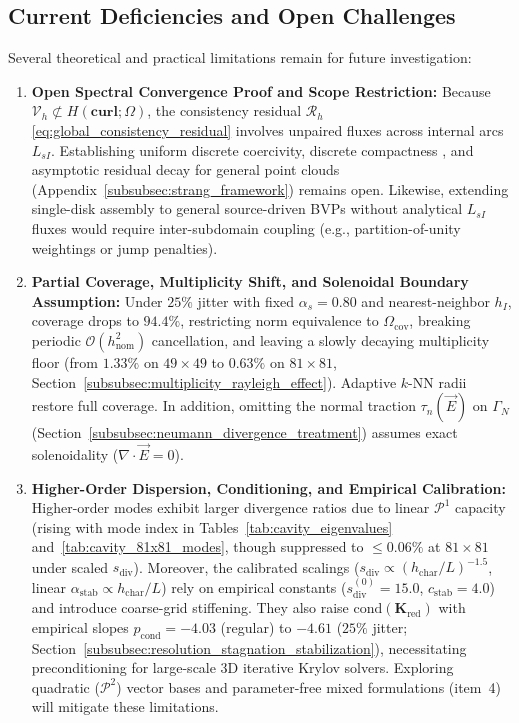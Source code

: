 \documentclass[VANCOUVER]{USG}
\begin{document}
\subsection{Current Deficiencies and Open Challenges}
\label{subsec:deficiencies_challenges}

Several theoretical and practical limitations remain for future investigation:
\begin{enumerate}
    \item \textbf{Open Spectral Convergence Proof and Scope Restriction:} Because $\mathcal{V}_h \not\subset H(\mathbf{curl};\Omega)$, the consistency residual $\mathcal{R}_h$ \eqref{eq:global_consistency_residual} involves unpaired fluxes across internal arcs $L_{sI}$. Establishing uniform discrete coercivity, discrete compactness \cite{boffi2006finite, boffi2013mixed}, and asymptotic residual decay for general point clouds (Appendix~\ref{subsubsec:strang_framework}) remains open. Likewise, extending single-disk assembly to general source-driven BVPs without analytical $L_{sI}$ fluxes would require inter-subdomain coupling (e.g., partition-of-unity weightings or jump penalties).
    \item \textbf{Partial Coverage, Multiplicity Shift, and Solenoidal Boundary Assumption:} Under $25\%$ jitter with fixed $\alpha_s = 0.80$ and nearest-neighbor $h_I$, coverage drops to $94.4\%$, restricting norm equivalence to $\Omega_{\mathrm{cov}}$, breaking periodic $\mathcal{O}(h_{\mathrm{nom}}^2)$ cancellation, and leaving a slowly decaying multiplicity floor (from $1.33\%$ on $49\times 49$ to $0.63\%$ on $81\times 81$, Section~\ref{subsubsec:multiplicity_rayleigh_effect}). Adaptive $k$-NN radii restore full coverage. In addition, omitting the normal traction $\tau_n(\vec{E})$ on $\Gamma_N$ (Section~\ref{subsubsec:neumann_divergence_treatment}) assumes exact solenoidality ($\nabla \cdot \vec{E} = 0$).
    \item \textbf{Higher-Order Dispersion, Conditioning, and Empirical Calibration:} Higher-order modes exhibit larger divergence ratios due to linear $\mathcal{P}^1$ capacity (rising with mode index in Tables~\ref{tab:cavity_eigenvalues} and~\ref{tab:cavity_81x81_modes}, though suppressed to $\le 0.06\%$ at $81\times 81$ under scaled $s_{\mathrm{div}}$). Moreover, the calibrated scalings ($s_{\mathrm{div}} \propto (h_{\mathrm{char}}/L)^{-1.5}$, linear $\alpha_{\mathrm{stab}} \propto h_{\mathrm{char}}/L$) rely on empirical constants ($s_{\mathrm{div}}^{(0)} = 15.0$, $c_{\mathrm{stab}} = 4.0$) and introduce coarse-grid stiffening. They also raise $\mathrm{cond}(\mathbf{K}_{\mathrm{red}})$ with empirical slopes $p_{\mathrm{cond}} = -4.03$ (regular) to $-4.61$ ($25\%$ jitter; Section~\ref{subsubsec:resolution_stagnation_stabilization}), necessitating preconditioning for large-scale 3D iterative Krylov solvers. Exploring quadratic ($\mathcal{P}^2$) vector bases and parameter-free mixed formulations (item~4) will mitigate these limitations.

\end{enumerate}
\end{document}
